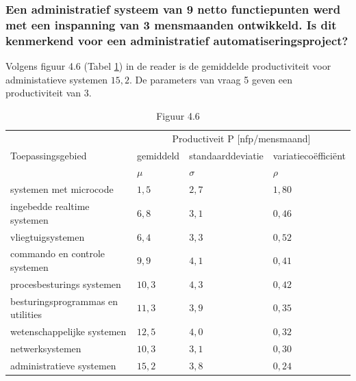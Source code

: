 \documentclass[a4paper,titlepage]{artikel1}
\begin{document}
   \subsubsection[Opdracht 5]{Een administratief systeem van 9 netto
   functiepunten werd met een inspanning van 3 mensmaanden
   ontwikkeld. Is dit kenmerkend voor een administratief
   automatiseringsproject?}
   Volgens figuur 4.6 (Tabel \ref{reffig46}) in de reader is de gemiddelde productiviteit voor administatieve systemen $15,2$. De parameters van vraag 5 geven een productiviteit van $3$.

   \begin{center}
   \begin{table}[h] %
     \caption{Figuur 4.6}\label{reffig46}
     \begin{center}
     \begin{tabular}[t]{|l|l|l|l|}
       \hline
       \multirow{3}{*}{Toepassingsgebied} & \multicolumn{3}{c|}{Productiveit P [nfp/mensmaand]} \\
       \cline{2-4}
       & gemiddeld & standaarddeviatie & variatieco\"{e}ffici\"{e}nt \\
       & $\mu$ & $\sigma$ & $\rho$ \\
       \hline
       systemen met microcode & $1,5$ & $2,7$ & $1,80$ \\
       ingebedde realtime systemen & $6,8$ & $3,1$ & $0,46$ \\
       vliegtuigsystemen & $6,4$ & $3,3$ & $0,52$ \\
       commando en controle systemen & $9,9$ & $4,1$ & $0,41$ \\
       procesbesturings systemen & $10,3$ & $4,3$ & $0,42$ \\
       besturingsprogrammas en utilities & $11,3$ & $3,9$ & $0,35$ \\
       wetenschappelijke systemen & $12,5$ & $4,0$ & $0,32$ \\
       netwerksystemen & $10,3$ & $3,1$ & $0,30$ \\
       administratieve systemen & $15,2$ & $3,8$ & $0,24$ \\
       \hline
     \end{tabular}
     \end{center}
   \end{table}
   \end{center}
   
\end{document}

